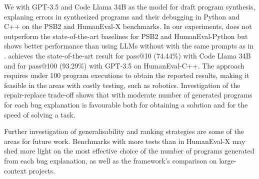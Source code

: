 We \method{} with GPT-3.5 and Code Llama 34B as the model for draft program synthesis, explaning errors in synthesized programs and their debugging in Python and C++ on the PSB2 and HumanEval-X benchmarks. 
In our experiments, \method{} does not outperform the state-of-the-art baselines for PSB2 and HumanEval-Python but shows better performance than using LLMs without \method{} with the same prompts as in \method{}.
\method{} achieves the state-of-the-art result for pass@10 (74.44\%) with Code Llama 34B and for pass@100 (93.29\%) with GPT-3.5 on HumanEval-C++. 
The approach requires under 100 program executions to obtain the reported results, 
making it feasible in the areas with costly testing, such as robotics.
Investigation of the repair-replace trade-off shows that \method{} with moderate number of generated programs for each bug explanation is favourable both for obtaining a solution and for the speed of solving a task. 

Further investigation of \method{} generalisability and ranking strategies are some of the areas for future work. 
Benchmarks with more tests than in HumanEval-X may shed more light on the most effective choice of the number of programs generated from each bug explanation, as well as the framework's comparison on large-context projects. 